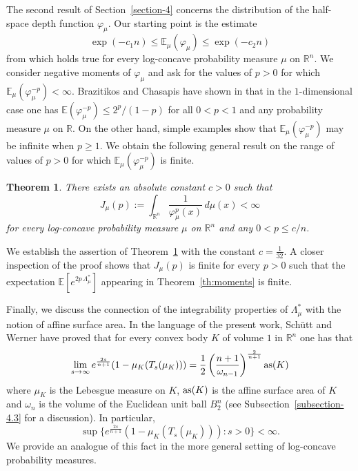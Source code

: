 \documentclass[11pt,leqno]{article}
\newtheorem{theorem}{Theorem}[section]
\theoremstyle{definition}
\theoremstyle{remark}
\numberwithin{equation}{section}
\newcommand{\ls}{\leqslant}
\newcommand{\gr}{\geqslant}
\newcommand{\1}{\textbf{1}}
\begin{document}
The second result of Section~\ref{section-4} concerns the distribution of the half-space depth function $\varphi_{\mu}$.
Our starting point is the estimate
$$\exp(-c_1n)\ls {\mathbb E}_{\mu }(\varphi_{\mu }) \ls\exp(-c_2n)$$
from \cite{BGP-depth} which holds true for every log-concave probability measure $\mu$ on ${\mathbb R}^n$.
We consider negative moments of $\varphi_{\mu}$ and ask for the values of $p>0$ for which ${\mathbb E}_{\mu }(\varphi_{\mu }^{-p})<\infty$. Brazitikos and Chasapis have shown in \cite{Brazitikos-Chasapis-2024} that in the $1$-dimensional case one has
${\mathbb E}(\varphi_{\mu}^{-p})\ls 2^p/(1-p)$ for all $0<p<1$ and any probability measure $\mu$ on $\mathbb{R}$.
On the other hand, simple examples show that ${\mathbb E}_{\mu }(\varphi_{\mu }^{-p})$ may be infinite when $p\gr 1$.
We obtain the following general result on the range of values of $p>0$ for which
${\mathbb E}_{\mu }(\varphi_{\mu }^{-p})$ is finite.

\begin{theorem}\label{th:negative-phi}There exists an absolute constant $c>0$ such that
$$J_{\mu}(p):=\int_{{\mathbb R}^n}\frac{1}{\varphi_{\mu}^p(x)}\,d\mu (x)<\infty$$
for every log-concave probability measure $\mu$ on $\mathbb{R}^n$ and any $0<p\ls c/n$.
\end{theorem}

We establish the assertion of Theorem~\ref{th:negative-phi} with the constant $c=\frac{1}{32}$. A closer inspection
of the proof shows that $J_\mu(p)$ is finite for every $p>0$ such that the expectation
$\mathbb{E}\!\left[e^{2p\,\Lambda_\mu^{\ast}}\right]$ appearing in Theorem~\ref{th:moments} is finite.


\smallskip

Finally, we discuss the connection of the integrability properties of $\Lambda_{\mu}^{\ast}$
with the notion of affine surface area. In the language of the present work,
Sch\"{u}tt and Werner \cite{Schutt-Werner-1990} have proved that for every convex body $K$ of volume $1$ in ${\mathbb R}^n$ one has that
\begin{equation}\label{eq:constant-floating}\lim_{s\to\infty} e^{\frac{2s}{n+1}}(1-\mu_K(T_s(\mu_K)))=\frac{1}{2}\left(\frac{n+1}{\omega_{n-1}}\right)^{\frac{2}{n+1}}
{\rm as}(K)\end{equation} where $\mu_K$ is the Lebesgue measure on $K$, ${\rm as}(K)$ is the affine surface area of $K$ and $\omega_n$ is the volume of the
Euclidean unit ball $B_2^n$ (see Subsection~\ref{subsection-4.3} for a discussion).
In particular,
$$\sup\{e^{\frac{2s}{n+1}}(1-\mu_K(T_s(\mu_K))):s>0\}<\infty .$$
We provide an analogue of this fact in the more general setting of log-concave probability measures.
\end{document}
